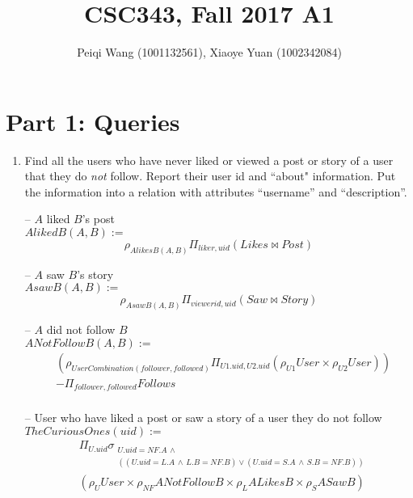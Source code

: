 \documentclass{article}
\title{CSC343, Fall 2017 A1}
\author{Peiqi Wang (1001132561), Xiaoye Yuan (1002342084)}
\newcommand{\var}[1]{\mathit{#1}}
\begin{document}
\maketitle  

\noindent


\section*{Part 1: Queries}

\begin{enumerate}

\item   %
Find all the users who have never liked or viewed a post or story 
of a user that they do {\it not} follow. 
Report their user id and ``about" information. 
Put the information into a relation with attributes ``username'' and ``description''. \\

{\large %

-- $A$ liked $B$'s post \\ 
$\var{AlikedB}(A,B) := $
\[
    \rho_{\var{AlikesB}(A,B)}
    \Pi_{liker, uid} 
    (\var{Likes} \bowtie \var{Post})
\]

-- $A$ saw $B$'s story \\ 
$\var{AsawB}(A,B) := $
\[
    \rho_{\var{AsawB}(A,B)}
    \Pi_{viewerid, uid} 
    (\var{Saw} \bowtie \var{Story})
\]

-- $A$ did not follow $B$ \\ 
$\var{ANotFollowB}(A,B) :=$
\begin{align*}
    &\left(\rho_{\var{UserCombination}(follower,followed)} \Pi_{U1.uid, U2.uid}( \rho_{U1}\var{User}\times\rho_{U2} \var{User})\right)  \\ 
    &- \Pi_{follower, followed} \var{Follows}\\ 
\end{align*}

-- User who have liked a post or saw a story of a user they do not follow \\ 
$\var{TheCuriousOnes}(uid) :=$
\begin{align*}
    &\Pi_{U.uid}
    \sigma_{
        \substack{
            U.uid=NF.A \,\land \\
            ((U.uid=L.A \,\land\, L.B=NF.B) \lor
            (U.uid=S.A \,\land\, S.B=NF.B))
        }
    }\\
    &(\rho_{U}\var{User} \times \rho_{NF} \var{ANotFollowB} \times \rho_{L} \var{ALikesB} \times \rho_{S} \var{ASawB})\\
\end{align*}

}
\end{enumerate}
\end{document}
